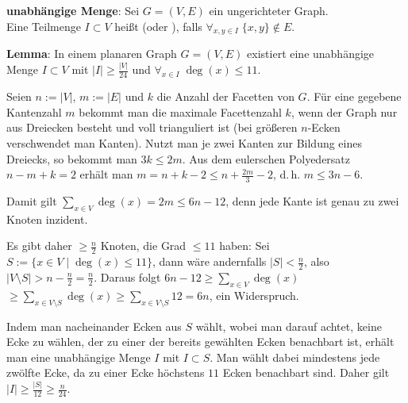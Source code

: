 \linie

\textbf{unabhängige Menge}:
Sei $G = (V, E)$ ein ungerichteter Graph.\\
Eine Teilmenge $I \subset V$ heißt  (oder ), falls
$\forall_{x, y \in I}\; \{x, y\} \notin E$.

\textbf{Lemma}:
In einem planaren Graph $G = (V, E)$ existiert eine unabhängige Menge $I \subset V$ mit
$|I| \ge \frac{|V|}{24}$ und $\forall_{x \in I}\; \deg(x) \le 11$.

\begin{Beweis}
    Seien $n := |V|$, $m := |E|$ und $k$ die Anzahl der Facetten von $G$.
    Für eine gegebene Kantenzahl $m$ bekommt man die maximale Facettenzahl $k$,
    wenn der Graph nur aus Dreiecken besteht und voll trianguliert ist
    (bei größeren $n$-Ecken verschwendet man Kanten).
    Nutzt man je zwei Kanten zur Bildung eines Dreiecks,
    so bekommt man $3k \le 2m$.
    Aus dem eulerschen Polyedersatz $n - m + k = 2$ erhält man
    $m = n + k - 2 \le n + \frac{2m}{3} - 2$, d.\,h. $m \le 3n - 6$.
    
    Damit gilt $\sum_{x \in V} \deg(x) = 2m \le 6n - 12$, denn jede Kante ist genau zu zwei Knoten
    inzident.
    
    Es gibt daher $\ge \frac{n}{2}$ Knoten, die Grad $\le 11$ haben:
    Sei $S := \{x \in V \;|\; \deg(x) \le 11\}$, dann wäre andernfalls $|S| < \frac{n}{2}$, also
    $|V \setminus S| > n - \frac{n}{2} = \frac{n}{2}$.
    Daraus folgt
    $6n - 12 \ge \sum_{x \in V} \deg(x)$\\
    $\ge \sum_{x \in V \setminus S} \deg(x)
    \ge \sum_{x \in V \setminus S} 12 = 6n$, ein Widerspruch.
    
    Indem man nacheinander Ecken aus $S$ wählt, wobei man darauf achtet, keine Ecke zu wählen,
    der zu einer der bereits gewählten Ecken benachbart ist,
    erhält man eine unabhängige Menge $I$ mit $I \subset S$.
    Man wählt dabei mindestens jede zwölfte Ecke, da zu einer Ecke höchstens $11$ Ecken benachbart
    sind.
    Daher gilt $|I| \ge \frac{|S|}{12} \ge \frac{n}{24}$.
\end{Beweis}

\linie

